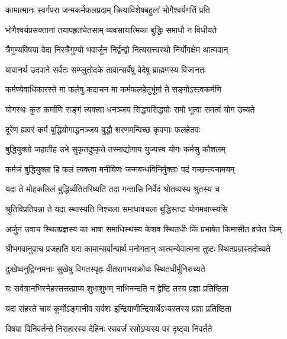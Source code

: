 \twolineshloka
{कामात्मानः स्वर्गपरा जन्मकर्मफलप्रदाम्}
{क्रियाविशेषबहुलां भोगैश्वर्यगतिं प्रति}%

\twolineshloka
{भोगैश्वर्यप्रसक्तानां तयापहृतचेतसाम्}
{व्यवसायात्मिका बुद्धिः समाधौ न विधीयते}%

\twolineshloka
{त्रैगुण्यविषया वेदा निस्त्रैगुण्यो भवार्जुन}
{निर्द्वन्द्वो नित्यसत्त्वस्थो निर्योगक्षेम आत्मवान्}%

\twolineshloka
{यावानर्थ उदपाने सर्वतः सम्प्लुतोदके}
{तावान्सर्वेषु वेदेषु ब्राह्मणस्य विजानतः}%

\twolineshloka
{कर्मण्येवाधिकारस्ते मा फलेषु कदाचन}
{मा कर्मफलहेतुर्भूर्मा ते सङ्गोऽस्त्वकर्मणि}%

\twolineshloka
{योगस्थः कुरु कर्माणि सङ्गं त्यक्त्वा धनञ्जय}
{सिद्ध्यसिद्ध्योः समो भूत्वा समत्वं योग उच्यते}%

\twolineshloka
{दूरेण ह्यवरं कर्म बुद्धियोगाद्धनञ्जय}
{बुद्धौ शरणमन्विच्छ कृपणाः फलहेतवः}%

\twolineshloka
{बुद्धियुक्तो जहातीह उभे सुकृतदुष्कृते}
{तस्माद्योगाय युज्यस्व योगः कर्मसु कौशलम्}%

\twolineshloka
{कर्मजं बुद्धियुक्ता हि फलं त्यक्त्वा मनीषिणः}
{जन्मबन्धविनिर्मुक्ताः पदं गच्छन्त्यनामयम्}%

\twolineshloka
{यदा ते मोहकलिलं बुद्धिर्व्यतितरिष्यति}
{तदा गन्तासि निर्वेदं श्रोतव्यस्य श्रुतस्य च}%

\twolineshloka
{श्रुतिविप्रतिपन्ना ते यदा स्थास्यति निश्चला}
{समाधावचला बुद्धिस्तदा योगमवाप्स्यसि}%

{अर्जुन उवाच}
\twolineshloka
{स्थितप्रज्ञस्य का भाषा समाधिस्थस्य केशव}
{स्थितधीः किं प्रभाषेत किमासीत व्रजेत किम्}%

{श्रीभगवानुवाच}
\twolineshloka
{प्रजहाति यदा कामान्सर्वान्पार्थ मनोगतान्}
{आत्मन्येवात्मना तुष्टः स्थितप्रज्ञस्तदोच्यते}%

\twolineshloka
{दुःखेष्वनुद्विग्नमनाः सुखेषु विगतस्पृहः}
{वीतरागभयक्रोधः स्थितधीर्मुनिरुच्यते}%

\twolineshloka
{यः सर्वत्रानभिस्नेहस्तत्तत्प्राप्य शुभाशुभम्}
{नाभिनन्दति न द्वेष्टि तस्य प्रज्ञा प्रतिष्ठिता}%

\twolineshloka
{यदा संहरते चायं कूर्मोऽङ्गानीव सर्वशः}
{इन्द्रियाणीन्द्रियार्थेऽभ्यस्तस्य प्रज्ञा प्रतिष्ठिता}%

\twolineshloka
{विषया विनिवर्तन्ते निराहारस्य देहिनः}
{रसवर्जं रसोऽप्यस्य परं दृष्ट्वा निवर्तते}%

